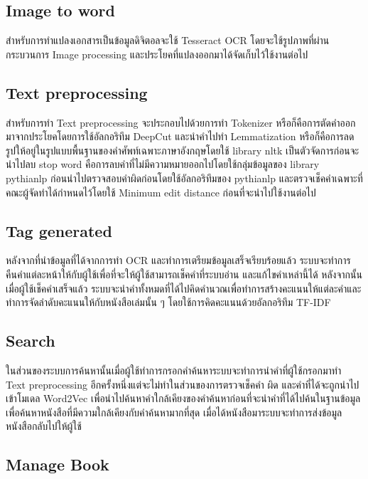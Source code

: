 \subsection{Image to word}

สำหรับการทำแปลงเอกสารเป็นข้อมูลดิจิตอลจะใช้ Tesseract OCR โดยจะใช้รูปภาพที่ผ่านกระบวนการ Image processing และประโยคที่แปลงออกมาได้จัดเก็บไว้ใช้งานต่อไป

\subsection{Text preprocessing}

สำหรับการทำ Text preprocessing จะประกอบไปด้วยการทำ Tokenizer หรือก็คือการตัดคำออกมาจากประโยคโดยการใช้อัลกอริทึม DeepCut และนำคำไปทำ Lemmatization หรือก็คือการลดรูปให้อยู่ในรูปแบบพื้นฐานของคำศัพท์เฉพาะภาษาอังกฤษโดยใช้ library nltk เป็นตัวจัดการก่อนจะนำไปลบ stop word คือการลบคำที่ไม่มีความหมายออกไปโดยใช้กลุ่มข้อมูลของ library pythianlp ก่อนนำไปตรวจสอบคำผิดก่อนโดยใช้อัลกอริทึมของ pythianlp และตรวจเช็คคำเฉพาะที่คณะผู้จัดทำได้กำหนดไว้โดยใช้ Minimum edit distance ก่อนที่จะนำไปใช้งานต่อไป

\subsection{Tag generated}

หลังจากที่นำข้อมูลที่ได้จากการทำ OCR และทำการเตรียมข้อมูลเสร็จเรียบร้อยแล้ว ระบบจะทำการคืนคำแต่ละหน้าให้กับผู้ใช้เพื่อที่จะให้ผู้ใช้สามารถเช็คคำที่ระบบอ่าน และแก้ไขคำเหล่านี้ได้ หลังจากนั้นเมื่อผู้ใช้เช็คคำเสร็จแล้ว ระบบจะนำคำทั้งหมดที่ได้ไปคิดคำนวณเพื่อทำการสร้างคะแนนให้แต่ละคำและทำการจัดลำดับคะแนนให้กับหนังสือเล่มนั้น ๆ โดยใช้การคิดคะแนนด้วยอัลกอริทึม TF-IDF 

\subsection{Search}

ในส่วนของระบบการค้นหานั้นเมื่อผู้ใช้ทำการกรอกคำค้นหาระบบจะทำการนำคำที่ผู้ใช้กรอกมาทำ Text preprocessing อีกครั้งหนึ่งแต่จะไม่ทำในส่วนของการตรวจเช็คคำ ผิด และคำที่ได้จะถูกนำไปเข้าโมเดล Word2Vec เพื่อนำไปค้นหาคำใกล้เคียงของคำค้นหาก่อนที่จะนำคำที่ได้ไปค้นในฐานข้อมูลเพื่อค้นหาหนังสือที่มีความใกล้เคียงกับคำค้นหามากที่สุด เมื่อได้หนังสือมาระบบจะทำการส่งข้อมูลหนังสือกลับไปให้ผู้ใช้

\subsection{Manage Book}

